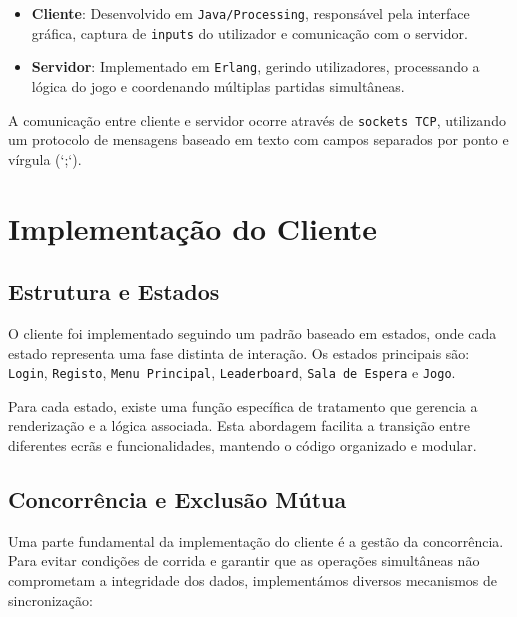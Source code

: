 \documentclass[12pt,a4paper]{report}
\begin{document}
\begin{itemize}
    \item \textbf{Cliente}: Desenvolvido em \texttt{Java/Processing}, responsável pela interface gráfica, captura de \texttt{inputs} do utilizador e comunicação com o servidor.
    
    \item \textbf{Servidor}: Implementado em \texttt{Erlang}, gerindo utilizadores, processando a lógica do jogo e coordenando múltiplas partidas simultâneas.
\end{itemize}

A comunicação entre cliente e servidor ocorre através de \texttt{sockets TCP}, utilizando um protocolo de mensagens baseado em texto com campos separados por ponto e vírgula (`;`).

\chapter{Implementação do Cliente}

\section{Estrutura e Estados}

O cliente foi implementado seguindo um padrão baseado em estados, onde cada estado representa uma fase distinta de interação. Os estados principais são: \texttt{Login}, \texttt{Registo}, \texttt{Menu Principal}, \texttt{Leaderboard}, \texttt{Sala de Espera} e \texttt{Jogo}.

Para cada estado, existe uma função específica de tratamento que gerencia a renderização e a lógica associada. Esta abordagem facilita a transição entre diferentes ecrãs e funcionalidades, mantendo o código organizado e modular.

\section{Concorrência e Exclusão Mútua}

Uma parte fundamental da implementação do cliente é a gestão da concorrência. Para evitar condições de corrida e garantir que as operações simultâneas não comprometam a integridade dos dados, implementámos diversos mecanismos de sincronização:
\end{document}
